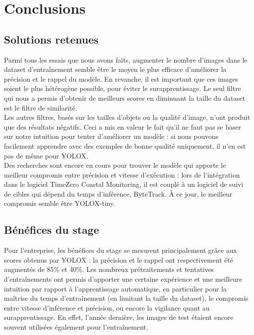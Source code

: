 \chapter{Conclusions}

\section{Solutions retenues}

Parmi tous les essais que nous avons faits, augmenter le nombre d'images dans le dataset 
d'entraînement semble être le moyen le plus efficace d'améliorer la précision et le 
rappel du modèle. En revanche, il est important que ces images soient le plus hétérogène possible, 
pour éviter le surapprentissage. Le seul filtre qui nous a permis d'obtenir de 
meilleurs scores en diminuant la taille du dataset est le filtre de similarité. \\

Les autres filtres, basés sur les tailles d'objets ou la qualité d'image, 
n'ont produit que des résultats négatifs. Ceci a mis en valeur le fait qu'il ne faut 
pas se baser sur notre intuition pour tenter d'améliorer un modèle : 
si nous pouvons facilement apprendre avec des exemples de bonne qualité uniquement, 
il n'en est pas de même pour YOLOX. \\

Des recherches sont encore en cours pour trouver le modèle qui apporte 
le meilleur compromis entre précision et vitesse d'exécution : lors 
de l'intégration dans le logiciel TimeZero Coastal Monitoring, il est couplé 
à un logiciel de suivi de cibles qui dépend du temps d'inférence, ByteTrack\cite{Zhang_Sun_Jiang_Yu_Weng_Yuan_Luo_Liu_Wang_2022}.
À ce jour, le meilleur compromis semble être YOLOX-tiny. 

\section{Bénéfices du stage}

Pour l'entreprise, les bénéfices du stage se mesurent principalement grâce aux scores obtenus 
par YOLOX : la précision et le rappel ont respectivement été augmentés de 85\%
et 40\%. Les nombreux prétraitements et tentatives d'entraînements ont permis d'apporter une certaine 
expérience et une meilleure intuition par rapport à l'apprentissage automatique, en particulier pour 
la maîtrise du temps d'entraînement (en limitant la taille du dataset), le compromis entre vitesse d'inférence 
et précision, ou encore la vigilance quant au surapprentissage. En effet, l'année dernière, les images de 
test étaient encore souvent utilisées également pour l'entraînement. \\

